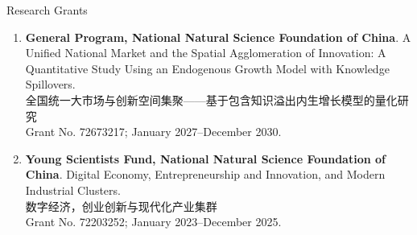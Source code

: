 \documentclass{resume} %
\begin{document}
\begin{rSection}{Research Grants}
\begin{enumerate}
\item \textbf{General Program, National Natural Science Foundation of China}. A Unified National Market and the Spatial Agglomeration of Innovation: A Quantitative Study Using an Endogenous Growth Model with Knowledge Spillovers.\\ {\small 全国统一大市场与创新空间集聚------基于包含知识溢出内生增长模型的量化研究}\\ Grant No. 72673217; January 2027--December 2030.

\item \textbf{Young Scientists Fund, National Natural Science Foundation of China}. Digital Economy, Entrepreneurship and Innovation, and Modern Industrial Clusters.\\ {\small 数字经济，创业创新与现代化产业集群}\\ Grant No. 72203252; January 2023--December 2025.
\end{enumerate}\end{rSection}
\clearpage
\end{document}
